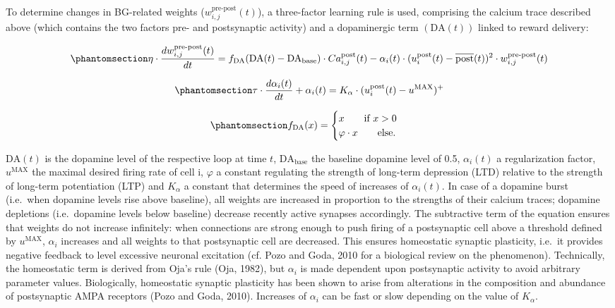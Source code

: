 \documentclass[
  11pt,
  a4paper,
]{scrbook}
\begin{document}
To determine changes in BG-related weights
(\(w_{i,j}^\text{pre-post}(t)\)), a three-factor learning rule is used,
comprising the calcium trace described above (which contains the two
factors pre- and postsynaptic activity) and a dopaminergic term
\((\text{DA}(t))\) linked to reward delivery:

\begin{equation}\phantomsection\label{eq-nn:w}{
     \eta  \cdot \frac{dw_{i,j}^\text{pre-post}(t)}{dt} = f_\text{DA}(\text{DA}(t)-\text{DA}_\text{base}) \cdot Ca^\text{post}_{i,j}(t) - \alpha_i(t) \cdot (u_i^\text{post}(t) - \overline{\text{post}}(t))^2 \cdot w_{i,j}^\text{pre-post}(t)
}\end{equation}

\begin{equation}\phantomsection\label{eq-nn:alpha}{
    \tau \cdot \frac{d \alpha_i(t)}{dt} + \alpha_i(t) = K_\alpha  \cdot (u_i^\text{post}(t) - u^\text{MAX})^+
}\end{equation}

\begin{equation}\phantomsection\label{eq-nn:da}{
    f_\text{DA}(x) = \begin{cases}  x \qquad \text{if } x > 0 \\
                                    \varphi \cdot x \qquad \text{else.} \\
                     \end{cases}
}\end{equation}

\(\text{DA}(t)\) is the dopamine level of the respective loop at time
\(t\), \(\text{DA}_\text{base}\) the baseline dopamine level of 0.5,
\(\alpha_i(t)\) a regularization factor, \(u^\text{MAX}\) the maximal
desired firing rate of cell i, \(\varphi\) a constant regulating the
strength of long-term depression (LTD) relative to the strength of
long-term potentiation (LTP) and \(K_\alpha\) a constant that determines
the speed of increases of \(\alpha_i(t)\). In case of a dopamine burst
(i.e.~when dopamine levels rise above baseline), all weights are
increased in proportion to the strengths of their calcium traces;
dopamine depletions (i.e.~dopamine levels below baseline) decrease
recently active synapses accordingly. The subtractive term of the
equation ensures that weights do not increase infinitely: when
connections are strong enough to push firing of a postsynaptic cell
above a threshold defined by \(u^\text{MAX}\), \(\alpha_i\) increases
and all weights to that postsynaptic cell are decreased. This ensures
homeostatic synaptic plasticity, i.e.~it provides negative feedback to
level excessive neuronal excitation (cf. Pozo and Goda, 2010 for a
biological review on the phenomenon). Technically, the homeostatic term
is derived from Oja's rule (Oja, 1982), but \(\alpha_i\) is made
dependent upon postsynaptic activity to avoid arbitrary parameter
values. Biologically, homeostatic synaptic plasticity has been shown to
arise from alterations in the composition and abundance of postsynaptic
AMPA receptors (Pozo and Goda, 2010). Increases of \(\alpha_i\) can be
fast or slow depending on the value of \(K_\alpha\).
\end{document}
